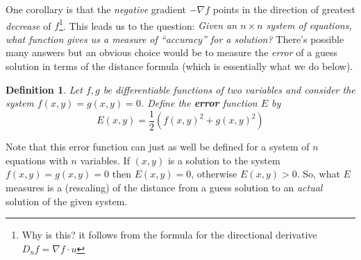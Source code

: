 \documentclass[12pt]{article}
\numberwithin{equation}{subsection}
\numberwithin{figure}{subsection}
\newtheorem{defn}[subsection]{Definition}
\theoremstyle{note}
\begin{document}
{One corollary is that the \textit{negative} gradient $-\nabla f$ points in the direction of greatest \textit{decrease} of $f$\footnote{Why is this? it follows from the formula for the directional derivative $D_uf=\nabla f \cdot u$}. This leads us to the question: \textit{Given an $n\times n$ system of equations, what function gives us a measure of ``accuracy'' for a solution?} There's possible many answers but an obvious choice would be to measure the \textit{error} of a guess solution in terms of the distance formula (which is essentially what we do below). 

\begin{defn} Let $f,g$ be differentiable functions of two variables and consider the system $f(x,y)=g(x,y)=0$. Define the \textbf{error} function $E$ by \begin{equation} \label{error} E(x,y)=\dfrac{1}{2} \left( f(x,y)^2 + g(x,y)^2 \right)\end{equation} \end{defn}

Note that this error function can just as well be defined for a system of $n$ equations with $n$ variables. If $(x,y)$ is a solution to the system $f(x,y)=g(x,y)=0$ then $E(x,y)=0$, otherwise $E(x,y)>0$. So, what $E$ measures is a (rescaling) of the distance from a guess solution to an \textit{actual} solution of the given system. 

}
\end{document}
